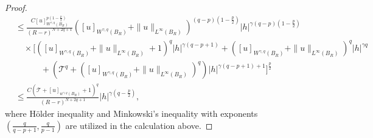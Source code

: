 \documentclass[reqno,10pt]{amsart}
\numberwithin{equation}{section}
\begin{document}
\begin{proof}
\begin{align}
		&\leq  \frac{C[u]_{W^{\gamma,q}\left(B_R\right)}^{p\left(1-\frac{p}{2}\right)}}{(R-r)^{N+2 q+1}}\left([ u]_{W^{\gamma, q}\left(B_R\right)}+\|u\|_{L^{\infty}\left(B_R\right)}\right)^{(q-p)\left(1-\frac{p}{2}\right)}|h|^{\gamma (q-p)\left(1-\frac{p}{2}\right)} \nonumber\\
		& \quad\times\Bigg[\left([u]_{W^{\gamma, q}\left(B_R\right)}+\|u\|_{L^{\infty}\left(B_R\right)}+1\right)^q|h|^{\gamma(q-p+1)}+\left([u]_{W^{\gamma, q}\left(B_R\right)}+\| u\|_{L^{\infty}\left(B_R\right)}\right)^q|h|^{\gamma q}\nonumber \\
		& \quad\qquad+\left(\mathcal{T}^q+\left([u]_{W^{\gamma, q}\left(B_R\right)}+\|u\|_{L^{\infty}\left(B_R\right)}\right)^q\right)|h|^{\gamma(q-p+1)+1}\Bigg]^{\frac{p}{2}}\nonumber\\
		&\leq \frac{C\left(\mathcal{T}+[u]_{w^{\gamma, q}\left(B_R\right)}+1\right)^q}{(R-r)^{N+2 q+1}}|h|^{\gamma \left(q-\frac{p}{2}\right)},
	\end{align}
	where Hölder inequality and Minkowski's inequality with exponents $\left( \frac{q}{q-p+1},\frac{q}{p-1}\right) $ are utilized  in the  calculation above.
	

\end{proof}
\end{document}
